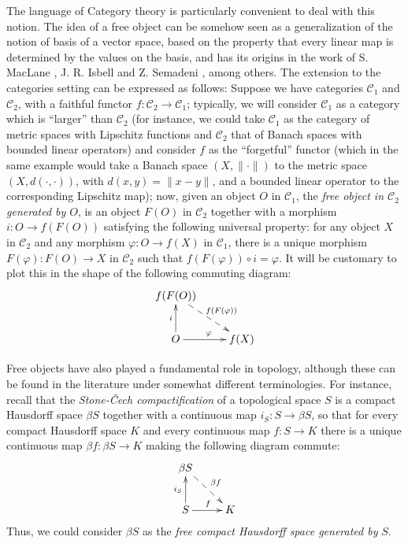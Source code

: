 \documentclass[12pt,leqno]{amsart}
\numberwithin{equation}{section} %
\theoremstyle{definition}
\numberwithin{equation}{section}
\begin{document}
The language of Category theory is particularly convenient to deal with this notion. The idea of a free object can be somehow seen as a generalization of the notion of basis of a vector space, based on the property that every linear map is determined by the values on the basis, and has its origins in the work of S. MacLane \cite{Maclane}, J. R. Isbell \cite{Isbell} and Z. Semadeni \cite{Semadeni}, among others. The extension to the categories setting can be expressed as follows: Suppose we have categories $\mathcal C_1$ and $\mathcal C_2$, with a faithful functor $f:\mathcal C_2\rightarrow \mathcal C_1$; typically, we will consider $\mathcal C_1$ as a category which is ``larger'' than $\mathcal C_2$ (for instance, we could take $\mathcal C_1$ as the category of metric spaces with Lipschitz functions and $\mathcal C_2$ that of Banach spaces with bounded linear operators) and consider $f$ as the ``forgetful'' functor (which in the same example would take a Banach space $(X,\|\cdot\|)$ to the metric space $(X,d(\cdot,\cdot))$, with $d(x,y)=\|x-y\|$, and a bounded linear operator to the corresponding Lipschitz map); now, given an object $O$ in $\mathcal C_1$, the \textit{free object in $\mathcal C_2$ generated by $O$}, is an object $F(O)$ in $\mathcal C_2$ together with a morphism $i:O\rightarrow f(F(O))$ satisfying the following universal property: for any object $X$ in $\mathcal C_2$ and any morphism $\varphi:O\rightarrow f(X)$ in $\mathcal C_1$, there is a unique morphism $F(\varphi):F(O)\rightarrow X$ in $\mathcal C_2$ such that $f(F(\varphi))\circ i=\varphi$. It will be customary to plot this in the shape of the following commuting diagram: 
$$
\xymatrix{f(F(O))\ar@{-->}[rd]^{f(F(\varphi))}&\\
 O\ar[r]^{\varphi}\ar^{i}[u]& f(X)}
$$

Free objects have also played a fundamental role in topology, although these can be found in the literature under somewhat different terminologies. For instance, recall that the \textit{Stone-\v{C}ech compactification} of a topological space $S$ is a compact Hausdorff space $\beta S$ together with a continuous map $i_S:S\rightarrow \beta S$, so that for every compact Hausdorff space $K$ and every continuous map $f:S\rightarrow K$ there is a unique continuous map $\beta f:\beta S\rightarrow K$ making the following diagram commute:
$$
\xymatrix{\beta S\ar@{-->}[rd]^{\beta f}&\\
 S\ar[r]^{f}\ar^{i_S}[u]& K}
$$
Thus, we could consider $\beta S$ as the \textit{free compact Hausdorff space generated by} $S$.\\
\end{document}
